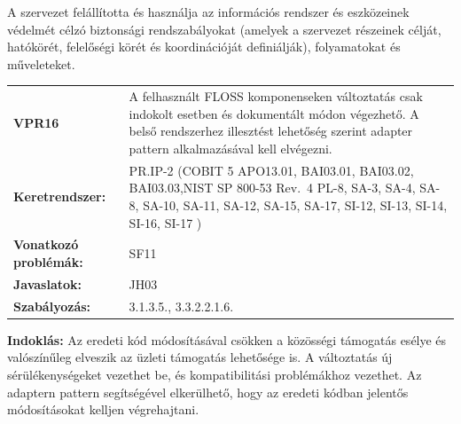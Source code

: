 \documentclass[12pt,magyar,a4paper,oneside]{scrreprt}
\begin{document}
A szervezet felállította és használja az információs rendszer és
eszközeinek védelmét célzó biztonsági rendszabályokat (amelyek a
szervezet részeinek célját, hatókörét, felelőségi körét és
koordinációját definiálják), folyamatokat és műveleteket.

\begin{longtable}[]{@{}ll@{}}
\toprule
\endhead
\begin{minipage}[t]{0.16\columnwidth}\raggedright
\textbf{VPR16}\strut
\end{minipage} & \begin{minipage}[t]{0.79\columnwidth}\raggedright
A felhasznált FLOSS komponenseken változtatás csak indokolt esetben és
dokumentált módon végezhető. A belső rendszerhez illesztést lehetőség
szerint adapter pattern alkalmazásával kell elvégezni.\strut
\end{minipage}\tabularnewline
\begin{minipage}[t]{0.16\columnwidth}\raggedright
\textbf{Keretrendszer:}\strut
\end{minipage} & \begin{minipage}[t]{0.79\columnwidth}\raggedright
PR.IP-2 (COBIT 5 APO13.01, BAI03.01, BAI03.02, BAI03.03,NIST SP 800-53
Rev.~4 PL-8, SA-3, SA-4, SA-8, SA-10, SA-11, SA-12, SA-15, SA-17, SI-12,
SI-13, SI-14, SI-16, SI-17 )\strut
\end{minipage}\tabularnewline
\begin{minipage}[t]{0.16\columnwidth}\raggedright
\textbf{Vonatkozó problémák:}\strut
\end{minipage} & \begin{minipage}[t]{0.79\columnwidth}\raggedright
SF11\strut
\end{minipage}\tabularnewline
\begin{minipage}[t]{0.16\columnwidth}\raggedright
\textbf{Javaslatok:}\strut
\end{minipage} & \begin{minipage}[t]{0.79\columnwidth}\raggedright
JH03\strut
\end{minipage}\tabularnewline
\begin{minipage}[t]{0.16\columnwidth}\raggedright
\textbf{Szabályozás:}\strut
\end{minipage} & \begin{minipage}[t]{0.79\columnwidth}\raggedright
3.1.3.5., 3.3.2.2.1.6.\strut
\end{minipage}\tabularnewline
\bottomrule
\end{longtable}

\textbf{Indoklás: } Az eredeti kód módosításával csökken a közösségi
támogatás esélye és valószínűleg elveszik az üzleti támogatás lehetősége
is. A változtatás új sérülékenységeket vezethet be, és kompatibilitási
problémákhoz vezethet. Az adaptern pattern segítségével elkerülhető,
hogy az eredeti kódban jelentős módosításokat kelljen végrehajtani.
\end{document}

